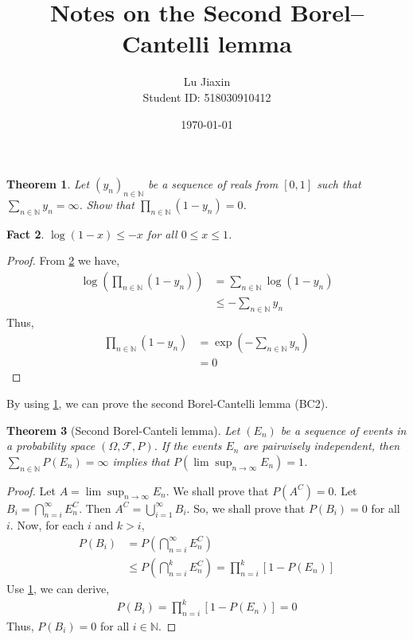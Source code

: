 \documentclass{article}
\title{Notes on the Second Borel–Cantelli lemma}
\author{Lu Jiaxin\\
Student ID: 518030910412}
\date{\today}
\newtheorem{theorem}{Theorem}
\newtheorem{fact}[theorem]{Fact}
\newcommand{\mbn}{\mathbb{N}}
\newcommand{\mcf}{\mathcal{F}}
\begin{document}
    \maketitle

\begin{tcolorbox}
    \begin{theorem}\label{thm1}
        Let $(y_n)_{n\in\mbn}$ be a sequence of reals from $[0,1]$ such that $\sum_{n\in\mbn} y_n = \infty$. Show that $\prod_{n\in\mbn}(1-y_n) = 0$.
    \end{theorem}  
\end{tcolorbox}

\begin{fact}\label{fact1}
    $\log(1-x) \leq -x$ for all $0\leq x \leq 1$.
\end{fact}

\begin{proof}
    From \cref{fact1} we have,
    \begin{align*}
        \log(\prod_{n\in\mbn}(1-y_n)) & = \sum_{n\in\mbn} \log(1-y_n) \\
        & \leq -\sum_{n\in\mbn} y_n
    \end{align*}
    Thus,
    \begin{align*}
        \prod_{n\in\mbn}(1-y_n) & = \exp(-\sum_{n\in\mbn} y_n)\\
        &= 0
    \end{align*}
\end{proof}


By using \cref{thm1}, we can prove the second Borel-Cantelli lemma (BC2).


\begin{tcolorbox}
    \begin{theorem}[Second Borel-Canteli lemma]\label{thm:BC2}
        Let $(E_n)$ be a sequence of events in a probability space $(\Omega, \mcf, P)$. If the events $E_n$ are pairwisely independent, then $\sum_{n\in\mbn} P(E_n) = \infty$ implies that $P(\lim \sup _{n \to \infty} E_n) = 1$.
    \end{theorem}  
\end{tcolorbox}

\begin{proof}
    Let $A = \lim \sup _{n \to \infty} E_n$. We shall prove that $P(A^C) = 0$. Let $B_i = \bigcap_{n=i}^{\infty} E_n^C$. Then $A^C = \bigcup_{i=1}^{\infty} B_i$. So, we shall prove that $P(B_i) = 0$ for all $i$. Now, for each $i$ and $k > i$,
    \begin{align*}
        P(B_i) &= P(\bigcap_{n=i}^{\infty} E_n^C) \\
        & \leq P(\bigcap_{n=i}^k E_n^C) = \prod_{n=i}^k[1-P(E_n)]
    \end{align*}
    Use \cref{thm1}, we can derive,
    \begin{align*}
        P(B_i) = \prod_{n=i}^k[1-P(E_n)] = 0
    \end{align*}
    Thus, $P(B_i) = 0$ for all $i \in \mbn$.        
\end{proof}
\end{document}
